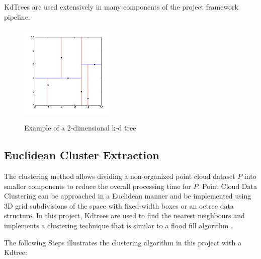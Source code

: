\documentclass[12pt]{report}
\begin{document}
KdTrees are used extensively in many components of the project framework pipeline.
\begin{figure}[H]%
  \centering
  \includegraphics[width=0.4\textwidth]{2d_kdtree.png}
 \caption{Example of a 2-dimensional k-d tree}\cite[]{Rusu_ICRA2011_PCL}
 \label{fig:kdtree} 
\end{figure}






\subsection{Euclidean Cluster Extraction}
\label{section:Euclidean Cluster Extraction}

The clustering method allows dividing a non-organized point cloud dataset \textbf{$P$} into smaller components to reduce the overall processing time for \textbf{$P$}.
Point Cloud Data Clustering can be approached in a Euclidean manner and be implemented using 3D grid subdivisions of the space with fixed-width boxes or an octree data structure.
In this project, Kdtrees are used to find the nearest neighbours and implements a clustering technique that is similar to a flood fill algorithm .

\newpage
The following Steps illustrates the clustering algorithm in this project with a Kdtree:
\end{document}
